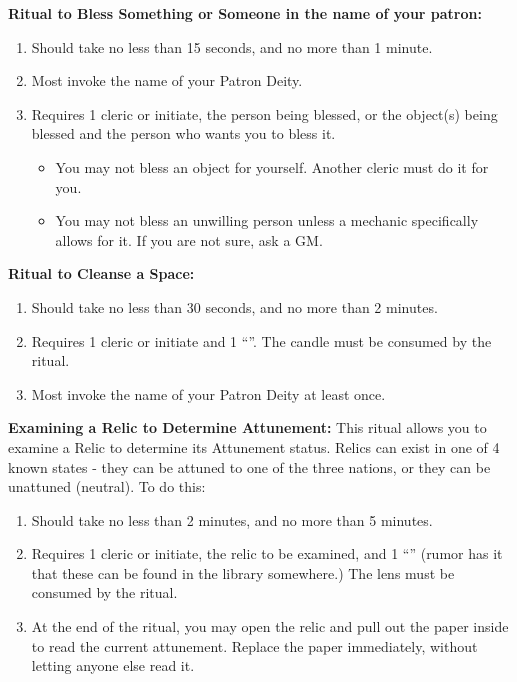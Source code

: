 \documentclass[green]{GL2020}
\begin{document}
\textbf{Ritual to Bless Something or Someone in the name of your patron:}
  \begin{enumerate}
    \item Should take no less than 15 seconds, and no more than 1 minute.
    \item Most invoke the name of your Patron Deity.
    \item Requires 1 cleric or initiate, the person being blessed, or the object(s) being blessed and the person who wants you to bless it. 
    \begin{itemize}
      \item You may not bless an object for yourself. Another cleric must do it for you.
      \item You may not bless an unwilling person unless a mechanic specifically allows for it. If you are not sure, ask a GM.
    \end{itemize}
  \end{enumerate}

\textbf{Ritual to Cleanse a Space:}
  \begin{enumerate}
    \item Should take no less than 30 seconds, and no more than 2 minutes.
    \item Requires 1 cleric or initiate and 1 ``\iRitualCandle{}''. The candle must be consumed by the ritual.
    \item Most invoke the name of your Patron Deity at least once.
  \end{enumerate}
   
\textbf{Examining a Relic to Determine Attunement:}
This ritual allows you to examine a Relic to determine its Attunement status. Relics can exist in one of 4 known states - they can be attuned to one of the three nations, or they can be unattuned (neutral). To do this:
  \begin{enumerate}
    \item Should take no less than 2 minutes, and no more than 5 minutes.
    \item Requires 1 cleric or initiate, the relic to be examined, and 1 ``\iCrystalLens{}'' (rumor has it that these can be found in the library somewhere.) The lens must be consumed by the ritual. 
    \item At the end of the ritual, you may open the relic and pull out the paper inside to read the current attunement. Replace the paper immediately, without letting anyone else read it.
  \end{enumerate}
   
\end{document}
